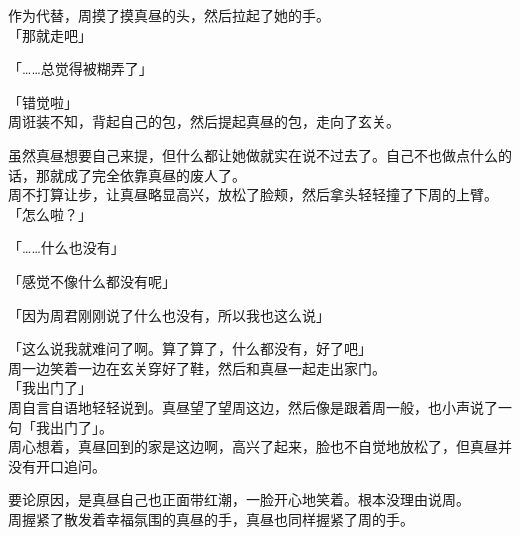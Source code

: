 作为代替，周摸了摸真昼的头，然后拉起了她的手。\\

「那就走吧」

「……总觉得被糊弄了」

「错觉啦」\\

周诳装不知，背起自己的包，然后提起真昼的包，走向了玄关。

虽然真昼想要自己来提，但什么都让她做就实在说不过去了。自己不也做点什么的话，那就成了完全依靠真昼的废人了。\\

周不打算让步，让真昼略显高兴，放松了脸颊，然后拿头轻轻撞了下周的上臂。\\

「怎么啦？」

「……什么也没有」

「感觉不像什么都没有呢」

「因为周君刚刚说了什么也没有，所以我也这么说」

「这么说我就难问了啊。算了算了，什么都没有，好了吧」\\

周一边笑着一边在玄关穿好了鞋，然后和真昼一起走出家门。\\

「我出门了」\\

周自言自语地轻轻说到。真昼望了望周这边，然后像是跟着周一般，也小声说了一句「我出门了」。\\

周心想着，真昼回到的家是这边啊，高兴了起来，脸也不自觉地放松了，但真昼并没有开口追问。

要论原因，是真昼自己也正面带红潮，一脸开心地笑着。根本没理由说周。\\

周握紧了散发着幸福氛围的真昼的手，真昼也同样握紧了周的手。
